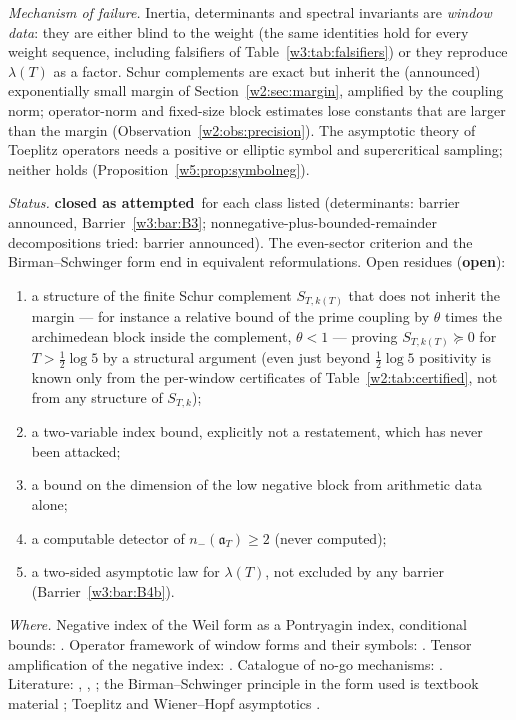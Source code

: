 \documentclass[11pt]{amsart}
\theoremstyle{definition}
\theoremstyle{remark}
\numberwithin{equation}{section}
\newcommand{\aT}{\mathfrak{a}_T}                       %
\newcommand{\lam}{\lambda(T)}                          %
\newcommand{\rtag}[1]{\textbf{\small\textsf{#1}}}
\newcommand{\closedA}{\rtag{closed as attempted}}
\newcommand{\openR}{\rtag{open}}
\newcommand{\entry}[1]{\par\smallskip\noindent\textit{#1.}\enspace}
\begin{document}
\entry{Mechanism of failure} Inertia, determinants and spectral invariants are \emph{window data}: they are either blind to
the weight (the same identities hold for every weight sequence, including falsifiers of Table~\ref{w3:tab:falsifiers}) or
they reproduce $\lam$ as a factor. Schur complements are exact but inherit the (announced) exponentially small margin of
Section~\ref{w2:sec:margin}, amplified by the coupling norm; operator-norm and fixed-size block estimates lose constants
that are larger than the margin (Observation~\ref{w2:obs:precision}). The asymptotic theory of Toeplitz operators needs a
positive or elliptic symbol and supercritical sampling; neither holds (Proposition~\ref{w5:prop:symbolneg}).

\entry{Status} \closedA\ for each class listed (determinants: barrier announced, Barrier~\ref{w3:bar:B3}; nonnegative-plus-bounded-remainder decompositions tried: barrier announced). The even-sector criterion and the Birman--Schwinger form end in equivalent
reformulations. Open residues (\openR):
\begin{enumerate}[label=(\alph*)]
\item a structure of the finite Schur complement $S_{T,k(T)}$ that does not inherit the margin --- for instance a relative
bound of the prime coupling by $\theta$ times the archimedean block inside the complement, $\theta<1$ --- proving
$S_{T,k(T)}\succeq0$ for $T>\frac12\log5$ by a structural argument (even just beyond $\frac12\log5$ positivity is
known only from the per-window certificates of Table~\ref{w2:tab:certified}, not from any structure of $S_{T,k}$);
\item a two-variable index bound, explicitly not a restatement, which has never been attacked;
\item a bound on the dimension of the low negative block from arithmetic data alone;
\item a computable detector of $n_-(\aT)\ge2$ (never computed);
\item a two-sided asymptotic law for $\lam$, not excluded by any barrier (Barrier~\ref{w3:bar:B4b}).
\end{enumerate}

\entry{Where} Negative index of the Weil form as a Pontryagin index, conditional bounds: \cite{P11}. Operator framework of
window forms and their symbols: \cite{P26}. Tensor amplification of the negative index: \cite{P28}. Catalogue of no-go
mechanisms: \cite{P41}. Literature: \cite{Haynsworth1968}, \cite{LandauWidom1980}, \cite{SlepianPollak1961}; the
Birman--Schwinger principle in the form used is textbook material \cite{ReedSimon4}; Toeplitz and Wiener--Hopf asymptotics
\cite{BottcherSilbermann2006}.
\end{document}
